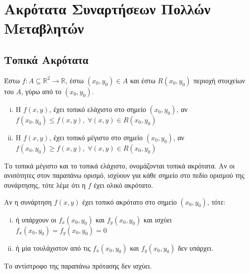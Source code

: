 


\everymath{\displaystyle}



\chapter{Ακρότατα Συναρτήσεων Πολλών Μεταβλητών}

\section{Τοπικά Ακρότατα}

\begin{dfn}
\item {}
  Έστω $ f \colon A \subseteq \mathbb{R}^{2} \to \mathbb{R} $, έστω 
  $ (x_{0}, y_{0}) \in A $ και έστω $R(x_{0}, y_{0}) $ περιοχή στοιχείων του $A$, 
  γύρω από το $ (x_{0}, y_{0}) $.
  \begin{enumerate}[i)]
    \item 
      Η $ f(x,y) $, έχει τοπικό ελάχιστο στο σημείο $ (x_{0}, y_{0}) $, αν 
      $ f(x_{0}, y_{0}) \leq f(x,y), \; \forall (x,y) \in R(x_{0}, y_{0}) $ 
    \item 
      Η $ f(x,y) $, έχει τοπικό μέγιστο στο σημείο $ (x_{0}, y_{0}) $, αν 
      $ f(x_{0}, y_{0}) \geq f(x,y), \; \forall (x,y) \in R(x_{0}, y_{0}) $ 
  \end{enumerate}
  Το τοπικά μέγιστο και το τοπικά ελάχιστο, ονομάζονται τοπικά ακρότατα. Αν οι 
  ανισότητες στον παραπάνω ορισμό, ισχύουν για κάθε σημείο στο πεδίο ορισμού
  της συνάρτησης, τότε λέμε ότι η $f$ έχει ολικό ακρότατο.
\end{dfn}

\begin{prop}
\item {}
  Αν η συνάρτηση $ f(x,y) $ έχει τοπικό ακρότατο στο σημείο $ (x_{0}, y_{0}) $, 
  τότε:
  \begin{enumerate}[i)]
    \item ή υπάρχουν οι $ f_{x}(x_{0}, y_{0}) $ και $ f_{y}(x_{0}, y_{0}) $ 
      και ισχύει $ f_{x}(x_{0}, y_{0}) = f_{y}(x_{0}, y_{0} )=0 $
    \item ή μία τουλάχιστον από τις $ f_{x}(x_{0}, y_{0}) $ και 
      $ f_{y}(x_{0}, y_{0}) $ δεν υπάρχει.
  \end{enumerate}
\end{prop}

\begin{rem}
\item {}
  Το αντίστροφο της παραπάνω πρότασης δεν ισχύει. 
\end{rem}

